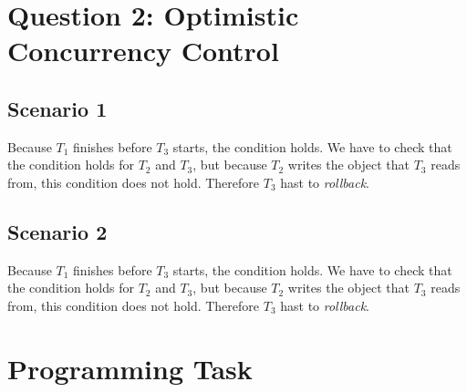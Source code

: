 \documentclass{article}      %
\begin{document}
\section*{Question 2: Optimistic Concurrency Control}

\subsection*{Scenario 1}

Because $T_1$ finishes before $T_3$ starts, the  condition holds. We have to check that the  condition holds for $T_2$ and $T_3$, but because $T_2$ writes the object that $T_3$ reads from, this condition does not hold. Therefore $T_3$ hast to \emph{rollback}.

\subsection*{Scenario 2}

Because $T_1$ finishes before $T_3$ starts, the  condition holds. We have to check that the  condition holds for $T_2$ and $T_3$, but because $T_2$ writes the object that $T_3$ reads from, this condition does not hold. Therefore $T_3$ hast to \emph{rollback}.


\section*{Programming Task}
\end{document}

